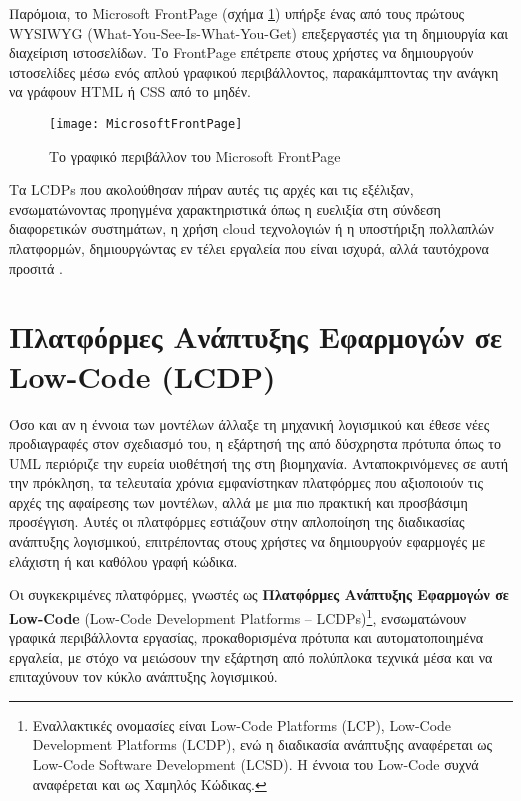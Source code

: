             Παρόμοια, το Microsoft FrontPage (σχήμα \ref{fig:MicrosoftFrontPage}) υπήρξε ένας από τους πρώτους WYSIWYG (What-You-See-Is-What-You-Get) επεξεργαστές για τη δημιουργία και διαχείριση ιστοσελίδων. Το FrontPage επέτρεπε στους χρήστες να δημιουργούν ιστοσελίδες μέσω ενός απλού γραφικού περιβάλλοντος, παρακάμπτοντας την ανάγκη να γράφουν HTML ή CSS από το μηδέν.

            \begin{figure}[h!] \noindent \centering
                \texttt{[image: MicrosoftFrontPage]}
                \caption{\centering Το γραφικό περιβάλλον του Microsoft FrontPage}
                \label{fig:MicrosoftFrontPage}
            \end{figure}

            Τα LCDPs που ακολούθησαν πήραν αυτές τις αρχές και τις εξέλιξαν, ενσωματώνοντας προηγμένα χαρακτηριστικά όπως η ευελιξία στη σύνδεση διαφορετικών συστημάτων, η χρήση cloud τεχνολογιών ή η υποστήριξη πολλαπλών πλατφορμών, δημιουργώντας εν τέλει εργαλεία που είναι ισχυρά, αλλά ταυτόχρονα προσιτά \cite{LowCodeSimon}.


    \section{Πλατφόρμες Ανάπτυξης Εφαρμογών σε Low-Code (LCDP)} \label{sec:LCDP}
        Όσο και αν η έννοια των μοντέλων άλλαξε τη μηχανική λογισμικού και έθεσε νέες προδιαγραφές στον σχεδιασμό του, η εξάρτησή της από δύσχρηστα πρότυπα όπως το UML περιόριζε την ευρεία υιοθέτησή της στη βιομηχανία. Ανταποκρινόμενες σε αυτή την πρόκληση, τα τελευταία χρόνια εμφανίστηκαν πλατφόρμες που αξιοποιούν τις αρχές της αφαίρεσης των μοντέλων, αλλά με μια πιο πρακτική και προσβάσιμη προσέγγιση. Αυτές οι πλατφόρμες εστιάζουν στην απλοποίηση της διαδικασίας ανάπτυξης λογισμικού, επιτρέποντας στους χρήστες να δημιουργούν εφαρμογές με ελάχιστη ή και καθόλου γραφή κώδικα.

        Οι συγκεκριμένες πλατφόρμες, γνωστές ως \textbf{Πλατφόρμες Ανάπτυξης Εφαρμογών σε Low-Code} (Low-Code Development Platforms -- LCDPs)\footnote{Εναλλακτικές ονομασίες είναι Low-Code Platforms (LCP), Low-Code Development Platforms (LCDP), ενώ η διαδικασία ανάπτυξης αναφέρεται ως Low-Code Software Development (LCSD). Η έννοια του Low-Code συχνά αναφέρεται και ως Χαμηλός Κώδικας.}, ενσωματώνουν γραφικά περιβάλλοντα εργασίας, προκαθορισμένα πρότυπα και αυτοματοποιημένα εργαλεία, με στόχο να μειώσουν την εξάρτηση από πολύπλοκα τεχνικά μέσα και να επιταχύνουν τον κύκλο ανάπτυξης λογισμικού.\cite{Bock2021}

